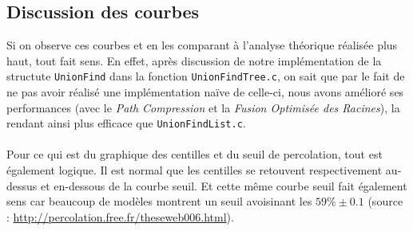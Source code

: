 \documentclass[12pt]{article}
\begin{document}
\subsection{Discussion des courbes}
Si on observe ces courbes et en les comparant à l'analyse théorique réalisée plus haut, tout fait sens. En effet, après discussion de notre implémentation 
de la structute \texttt{UnionFind} dans la fonction \texttt{UnionFindTree.c}, on sait que par le fait de ne pas avoir réalisé une implémentation naïve de celle-ci, nous 
avons amélioré ses performances (avec le \textit{Path Compression} et la \textit{Fusion Optimisée des Racines}), la rendant ainsi plus efficace que \texttt{UnionFindList.c}.
\paragraph{}
Pour ce qui est du graphique des centilles et du seuil de percolation, tout est également logique. Il est normal que les centilles se retouvent respectivement au-dessus et en-dessous de la courbe seuil. 
Et cette même courbe seuil fait également sens car beaucoup de modèles montrent un seuil avoisinant les $59\% \pm 0.1$ (source : \url{http://percolation.free.fr/theseweb006.html}).
\end{document}

